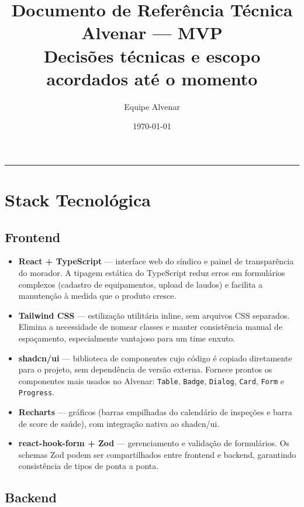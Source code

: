 \documentclass[12pt, a4paper]{article}
\title{
    \vspace{-1cm}
    {\large\color{accent} Documento de Referência Técnica} \\
    \vspace{0.3cm}
    {\LARGE\bfseries\color{primary} Alvenar — MVP} \\
    \vspace{0.3cm}
    {\normalsize Decisões técnicas e escopo acordados até o momento}
}
\author{Equipe Alvenar}
\date{\today}
\begin{document}
\maketitle
\vspace{0.5cm}
\hrule
\vspace{1cm}

\section{Stack Tecnológica}

\subsection{Frontend}

\begin{itemize}[leftmargin=1.5em]
    \item \textbf{React + TypeScript} — interface web do síndico e painel de transparência do morador.
    A tipagem estática do TypeScript reduz erros em formulários complexos (cadastro de equipamentos,
    upload de laudos) e facilita a manutenção à medida que o produto cresce.
    \item \textbf{Tailwind CSS} — estilização utilitária inline, sem arquivos CSS separados.
    Elimina a necessidade de nomear classes e manter consistência manual de espaçamento,
    especialmente vantajoso para um time enxuto.
    \item \textbf{shadcn/ui} — biblioteca de componentes cujo código é copiado diretamente
    para o projeto, sem dependência de versão externa. Fornece prontos os componentes mais
    usados no Alvenar: \texttt{Table}, \texttt{Badge}, \texttt{Dialog}, \texttt{Card},
    \texttt{Form} e \texttt{Progress}.
    \item \textbf{Recharts} — gráficos (barras empilhadas do calendário de inspeções e
    barra de score de saúde), com integração nativa ao shadcn/ui.
    \item \textbf{react-hook-form + Zod} — gerenciamento e validação de formulários.
    Os schemas Zod podem ser compartilhados entre frontend e backend, garantindo
    consistência de tipos de ponta a ponta.
\end{itemize}

\subsection{Backend}
\end{document}
